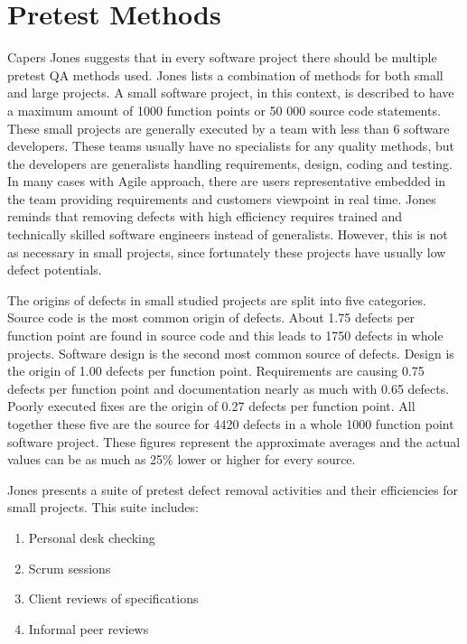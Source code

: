  \section{Pretest Methods}

Capers Jones suggests that in every software project there should be multiple pretest QA methods used. Jones lists a combination of methods for both small and large projects. A small software project, in this context, is described to have a maximum amount of 1000 function points or 50 000 source code statements. These small projects are generally executed by a team with less than 6 software developers. These teams usually have no specialists for any quality methods, but the developers are generalists handling requirements, design, coding and testing. In many cases with Agile approach, there are users representative embedded in the team providing requirements and customers viewpoint in real time. Jones reminds that removing defects with high efficiency requires trained and technically skilled software engineers instead of generalists. However, this is not as necessary in small projects, since fortunately these projects have usually low defect potentials.

The origins of defects in small studied projects are split into five categories. Source code is the most common origin of defects. About 1.75 defects per function point are found in source code and this leads to 1750 defects in whole projects. Software design is the second most common source of defects. Design is the origin of 1.00 defects per function point. Requirements are causing 0.75 defects per function point and documentation nearly as much with 0.65 defects. Poorly executed fixes are the origin of 0.27 defects per function point. All together these five are the source for 4420 defects in a whole 1000 function point software project. These figures represent the approximate averages and the actual values can be as much as 25\% lower or higher for every source. 

Jones presents a suite of pretest defect removal activities and their efficiencies for small projects. This suite includes:

\begin{enumerate}

\item Personal desk checking

\item Scrum sessions

\item Client reviews of specifications

\item Informal peer reviews

\end{enumerate}

